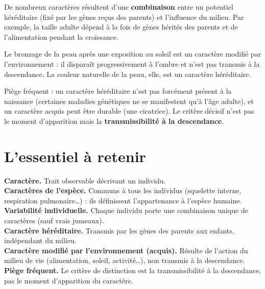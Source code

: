 \begin{propriete}
De nombreux caractères résultent d'une \textbf{combinaison} entre un potentiel
héréditaire (fixé par les gènes reçus des parents) et l'influence du milieu. Par
exemple, la taille adulte dépend à la fois de gènes hérités des parents et de
l'alimentation pendant la croissance.
\end{propriete}

\begin{exemple}
Le bronzage de la peau après une exposition au soleil est un caractère modifié par
l'environnement : il disparaît progressivement à l'ombre et n'est pas transmis à la
descendance. La couleur naturelle de la peau, elle, est un caractère héréditaire.
\end{exemple}

\begin{remarque}
Piège fréquent : un caractère héréditaire n'est pas forcément présent à la naissance
(certaines maladies génétiques ne se manifestent qu'à l'âge adulte), et un caractère
acquis peut être durable (une cicatrice). Le critère décisif n'est pas le moment
d'apparition mais la \textbf{transmissibilité à la descendance}.
\end{remarque}

\section{L'essentiel à retenir}

\begin{synthese}
\textbf{Caractère.} Trait observable décrivant un individu.\\[4pt]
\textbf{Caractères de l'espèce.} Communs à tous les individus (squelette interne,
respiration pulmonaire\dots) : ils définissent l'appartenance à l'espèce humaine.\\[4pt]
\textbf{Variabilité individuelle.} Chaque individu porte une combinaison unique de
caractères (sauf vrais jumeaux).\\[4pt]
\textbf{Caractère héréditaire.} Transmis par les gènes des parents aux enfants,
indépendant du milieu.\\[4pt]
\textbf{Caractère modifié par l'environnement (acquis).} Résulte de l'action du milieu
de vie (alimentation, soleil, activité\dots), non transmis à la descendance.\\[4pt]
\textbf{Piège fréquent.} Le critère de distinction est la transmissibilité à la
descendance, pas le moment d'apparition du caractère.
\end{synthese}


